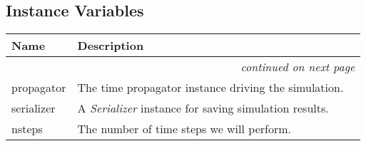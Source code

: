
  \subsection{Instance Variables}

    \vspace{-1cm}
\hspace{\varindent}\begin{longtable}{|p{\varnamewidth}|p{\vardescrwidth}|l}
\cline{1-2}
\cline{1-2} \centering \textbf{Name} & \centering \textbf{Description}& \\
\cline{1-2}
\endhead\cline{1-2}\multicolumn{3}{r}{\small\textit{continued on next page}}\\\endfoot\cline{1-2}
\endlastfoot\raggedright p\-r\-o\-p\-a\-g\-a\-t\-o\-r\- & The time propagator instance driving the simulation.&\\
\cline{1-2}
\raggedright s\-e\-r\-i\-a\-l\-i\-z\-e\-r\- & A \textit{Serializer} instance for saving simulation results.&\\
\cline{1-2}
\raggedright n\-s\-t\-e\-p\-s\- & The number of time steps we will perform.&\\
\cline{1-2}
\end{longtable}


